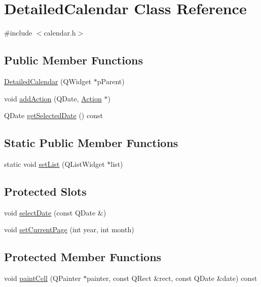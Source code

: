 \hypertarget{class_detailed_calendar}{\section{Detailed\-Calendar Class Reference}
\label{class_detailed_calendar}
}


{\ttfamily \#include $<$calendar.\-h$>$}

\subsection*{Public Member Functions}
\begin{DoxyCompactItemize}
\item 
\hyperlink{class_detailed_calendar_aa9f4a0f1c2ed25b210893081f579a5f8}{Detailed\-Calendar} (Q\-Widget $\ast$p\-Parent)
\item 
void \hyperlink{class_detailed_calendar_aa0b23418872fbc7ce6eb23ac3f888384}{add\-Action} (Q\-Date, \hyperlink{class_action}{Action} $\ast$)
\item 
Q\-Date \hyperlink{class_detailed_calendar_adeae63eb638d8f105769d0a611dd1ceb}{get\-Selected\-Date} () const 
\end{DoxyCompactItemize}
\subsection*{Static Public Member Functions}
\begin{DoxyCompactItemize}
\item 
static void \hyperlink{class_detailed_calendar_a9f934d9e6b5f171c5d393add3dd75b4b}{set\-List} (Q\-List\-Widget $\ast$list)
\end{DoxyCompactItemize}
\subsection*{Protected Slots}
\begin{DoxyCompactItemize}
\item 
void \hyperlink{class_detailed_calendar_a40faf426231571f1bf959b4b4026c8be}{select\-Date} (const Q\-Date \&)
\item 
void \hyperlink{class_detailed_calendar_a955c6477aca828d83ff80bc9d3af7ceb}{set\-Current\-Page} (int year, int month)
\end{DoxyCompactItemize}
\subsection*{Protected Member Functions}
\begin{DoxyCompactItemize}
\item 
void \hyperlink{class_detailed_calendar_a9dd0c5c754da4f0224c8251545a1ab57}{paint\-Cell} (Q\-Painter $\ast$painter, const Q\-Rect \&rect, const Q\-Date \&date) const 
\end{DoxyCompactItemize}

